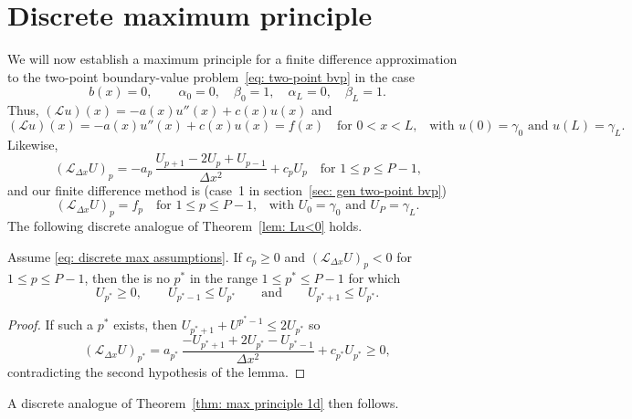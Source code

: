 \section{Discrete maximum principle}

We will now establish a maximum principle for a finite difference approximation 
to the two-point boundary-value problem~\eqref{eq: two-point bvp} in the case
\begin{equation}\label{eq: discrete max assumptions}
b(x)=0,\qquad\alpha_0=0,\quad\beta_0=1,\quad\alpha_L=0,\quad\beta_L=1.
\end{equation}
Thus, $(\mathcal{L}u)(x)=-a(x)u''(x)+c(x)u(x)$ and
\begin{equation}\label{eq: simple Lu=f}
(\mathcal{L}u)(x)=-a(x)u''(x)+c(x)u(x)=f(x)\quad\text{for~$0<x<L$,}\quad
\text{with $u(0)=\gamma_0$~and $u(L)=\gamma_L$.}
\end{equation}
Likewise,
\[
(\mathcal{L}_{\Delta x}U)_p=-a_p\,\frac{U_{p+1}-2U_p+U_{p-1}}{\Delta x^2}
	+c_pU_p\quad\text{for $1\le p\le P-1$,}
\]
and our finite difference method is (case~1 in 
section~\ref{sec: gen two-point bvp})
\begin{equation}\label{eq: finite diff Dirichlet 1d}
(\mathcal{L}_{\Delta x}U)_p=f_p\quad\text{for $1\le p\le P-1$,}\quad
	\text{with $U_0=\gamma_0$ and $U_P=\gamma_L$.}
\end{equation}
The following discrete analogue of Theorem~\ref{lem: Lu<0} holds.

\begin{lemma}\label{lem: discrete LU<0}
Assume \eqref{eq: discrete max assumptions}.
If $c_p\ge0$ and $(\mathcal{L}_{\Delta x}U)_p<0$ for~$1\le p\le P-1$, then
the is no $p^*$ in the range $1\le p^*\le P-1$ for which
\[
U_{p^*}\ge 0,\qquad U_{p^*-1}\le U_{p^*}\qquad\text{and}\qquad
U_{p^*+1}\le U_{p^*}.
\]
\end{lemma}
\begin{proof}
If such a $p^*$ exists, then $U_{p^*+1}+U^{p^*-1}\le 2U_{p^*}$ so
\[
(\mathcal{L}_{\Delta x}U)_{p^*}
	=a_{p^*}\,\frac{-U_{p^*+1}+2U_{p^*}-U_{p^*-1}}{\Delta x^2}
	+c_{p^*}U_{p^*}\ge 0,
\]
contradicting the second hypothesis of the lemma.
\end{proof}

A discrete analogue of Theorem~\ref{thm: max principle 1d} then follows.

